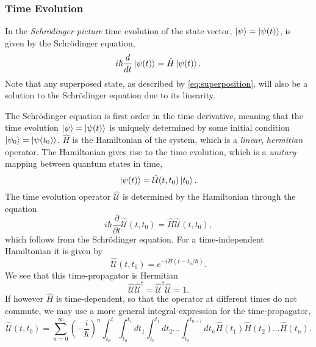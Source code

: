     \subsubsection{Time Evolution}
    In the \emph{Schrödinger picture}
    time evolution of the state vector, $\ket{\psi} = \ket{\psi (t)}$, is given by the Schrödinger
    equation,
    \begin{equation}
        i\hbar \frac{d}{dt} \ket{\psi (t)} = \hat{H} \ket{\psi (t)}.
    \end{equation}
    Note that any superposed state, as described by \ref{eq:superposition}, will also be 
    a solution to the Schrödinger equation due to its linearity.

    The Schrödinger equation is first order in the time derivative, meaning that the time 
    evolution $\ket{\psi} = \ket{\psi(t)}$ is uniquely determined by some initial 
    condition $\ket{\psi_0} = \ket{\psi(t_0)}$. $\hat{H}$ is the Hamiltonian of the system,
    which is a \emph{linear}, \emph{hermitian} operator. The Hamiltonian gives rise to the 
    time evolution, which is a \emph{unitary} mapping between quantum states in time,
    \begin{equation}
        \ket{\psi(t)} =  \hat{\mathcal{U}}(t, t_0) \ket{t_0}.
    \end{equation}
    The time evolution operator $\hat{\mathcal{U}}$ is determined by the Hamiltonian 
    through the equation 
    \begin{equation}
        i\hbar \frac{\partial}{\partial t} \hat{\mathcal{U}}(t, t_0)
            = \hat{H}\hat{\mathcal{U}}(t, t_0),
    \end{equation}
    which follows from the Schrödinger equation. For a time-independent 
    Hamiltonian it is given by 
    \begin{equation}
        \hat{\mathcal{U}}(t, t_0) = e^{-i \hat{H}(t - t_0/\hbar)}.
    \end{equation}
    We see that this time-propagator is Hermitian 
    \begin{equation}
        \hat{\mathcal{U}}\hat{\mathcal{U}}^\dagger 
        = \hat{\mathcal{U}}^\dagger \hat{\mathcal{U}} = 1.
    \end{equation}
    If however $\hat{H}$ is time-dependent, so that the operator at different times do 
    not commute, we may use a more general integral expression for the time-propagator,
    \begin{equation}
        \hat{\mathcal{U}}(t, t_0)
         = \sum_{n=0}^\infty (-\frac{i}{\hbar})^n
            \int_{t_0}^t \int_{t_0}^{t_1}dt_1 \int_{t_0}^{t_1}dt_2 \dots \int_{t_0}^{t_{n-1}}
                dt_n \hat{H}(t_1)\hat{H}(t_2) \dots \hat{H}(t_n).
    \end{equation}

